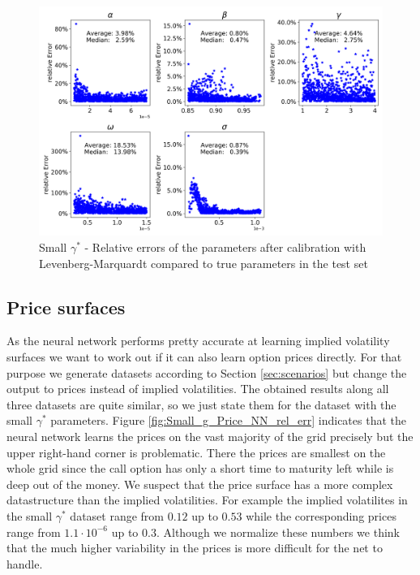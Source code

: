 \documentclass{article}
\begin{document}
\begin{figure}[!ht]
\centering
\includegraphics[width=\textwidth]{Small_g_Vola_HNG_ParameterRelativeErrors.png}
\caption{Small $\gamma^*$ - Relative errors of the parameters after calibration with Levenberg-Marquardt compared to true parameters in the test set}
\label{fig:Small_g_par_sen}
\end{figure}

\subsection{Price surfaces}\label{sec:price_surf}
As the neural network performs pretty accurate at learning implied volatility surfaces we want to work out if it can also learn option prices directly. For that purpose we generate datasets according to Section \ref{sec:scenarios} but change the output to prices instead of implied volatilities. The obtained results along all three datasets are quite similar, so we just state them for the dataset with the small $\gamma^*$ parameters. \newline
Figure \ref{fig:Small_g_Price_NN_rel_err} indicates that the neural network learns the prices on the vast majority of the grid precisely but the upper right-hand corner is problematic. There the prices are smallest on the whole grid since the call option has only a short time to maturity left while is deep out of the money. We suspect that the price surface has a more complex datastructure than the implied volatilities. For example the implied volatilites in the small $\gamma^*$ dataset range from $0.12$ up to $0.53$ while the corresponding prices range from $1.1\cdot 10^{-6}$ up to $0.3$. Although we normalize these numbers we think that the much higher variability in the prices is more difficult for the net to handle. 
\end{document}
